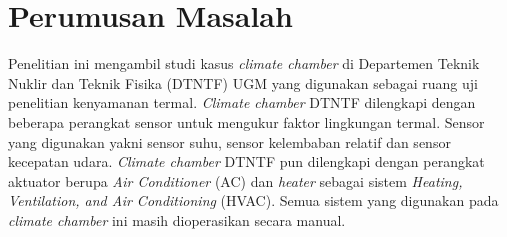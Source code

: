 


\section{Perumusan Masalah}
Penelitian ini mengambil studi kasus \textit{climate chamber} di Departemen Teknik Nuklir dan Teknik Fisika (DTNTF) UGM yang digunakan sebagai ruang uji penelitian kenyamanan termal. \textit{Climate chamber} DTNTF dilengkapi dengan beberapa perangkat sensor untuk mengukur faktor lingkungan termal. Sensor yang digunakan yakni sensor suhu, sensor kelembaban relatif dan sensor kecepatan udara. \textit{Climate chamber} DTNTF pun dilengkapi dengan perangkat aktuator berupa \textit{Air Conditioner} (AC) dan \textit{heater} sebagai sistem \textit{Heating, Ventilation, and Air Conditioning} (HVAC). Semua sistem yang digunakan pada \textit{climate chamber} ini masih dioperasikan secara manual.


